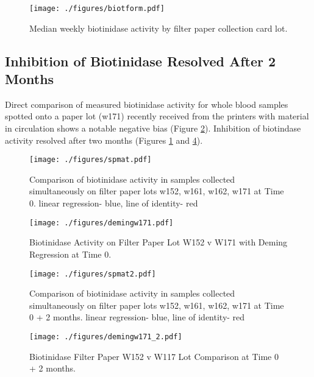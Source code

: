 \documentclass[review]{elsarticle}
\begin{document}
\begin{figure}[htbp]
\centering
\texttt{[image: ./figures/biotform.pdf]}
\caption{\label{fig:org1b9e7e1}Median weekly biotinidase activity by filter paper collection card lot.}
\end{figure}

\clearpage

\subsection*{Inhibition of Biotinidase Resolved After 2 Months}
\label{sec:org9f553f5}
Direct comparison of measured biotinidase activity for whole blood
samples spotted onto a paper lot (w171) recently received from the
printers with material in circulation shows a notable negative
bias (Figure \ref{fig:orgee61564}). Inhibition of biotindase activity resolved after two months
(Figures \ref{fig:org1b9e7e1} and \ref{fig:orgbc4c2bf}).

\begin{figure}[htbp]
\centering
\texttt{[image: ./figures/spmat.pdf]}
\caption{\label{fig:orgee61564}Comparison of biotinidase activity in samples collected simultaneously on filter paper lots w152, w161, w162, w171 at Time 0. linear regression- blue, line of identity- red}
\end{figure}

\begin{figure}[htbp]
\centering
\texttt{[image: ./figures/demingw171.pdf]}
\caption{\label{fig:org6510321}Biotinidase Activity on Filter Paper Lot W152 v W171 with Deming Regression at Time 0.}
\end{figure}
\clearpage

\begin{figure}[htbp]
\centering
\texttt{[image: ./figures/spmat2.pdf]}
\caption{\label{fig:orgbc4c2bf}Comparison of biotinidase activity in samples collected simultaneously on filter paper lots w152, w161, w162, w171 at Time 0 + 2 months. linear regression- blue, line of identity- red}
\end{figure}

\begin{figure}[htbp]
\centering
\texttt{[image: ./figures/demingw171\_2.pdf]}
\caption{\label{fig:org5ce37a9}Biotinidase Filter Paper W152 v W117 Lot Comparison at Time 0 + 2 months.}
\end{figure}

\clearpage
\end{document}
